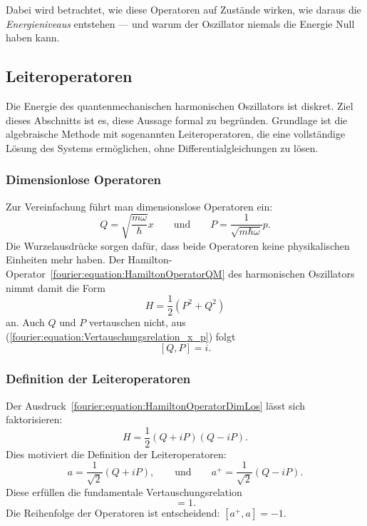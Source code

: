 Dabei wird betrachtet, wie diese Operatoren auf Zustände wirken, wie daraus die \emph{Energieniveaus} entstehen ---
und warum der Oszillator niemals die Energie Null haben kann.

\subsection{Leiteroperatoren\label{fourier:subsection:Leiteroperatoren}}
Die Energie des quantenmechanischen harmonischen Oszillators ist diskret.
Ziel dieses Abschnitts ist es, diese Aussage formal zu begründen.
Grundlage ist die algebraische Methode mit sogenannten Leiteroperatoren, die eine vollständige Lösung des Systems ermöglichen, ohne Differentialgleichungen zu lösen.	

\subsubsection{Dimensionlose Operatoren\label{fourier:subsubsection:DimensionsloseOperatoren}}
Zur Vereinfachung führt man dimensionslose Operatoren ein:
%
\[
	Q = \sqrt{\frac{m\omega}{\hbar}}x
	\qquad\text{und}\qquad
	P = \frac{1}{\sqrt{m\hbar\omega}}p.
\]
Die Wurzelausdrücke sorgen dafür, dass beide Operatoren keine physikalischen Einheiten mehr haben.
Der Hamilton-Operator~\ref{fourier:equation:HamiltonOperatorQM} des harmonischen Oszillators nimmt damit die Form
\begin{equation}\label{fourier:equation:HamiltonOperatorDimLos}
	H = \frac{1}{2}(P^2 + Q^2)
\end{equation}
an.
Auch $Q$ und $P$ vertauschen nicht, aus (\ref{fourier:equation:Vertauschungsrelation_x_p}) folgt
\[
	[Q,P] = i.
\]

\subsubsection{Definition der Leiteroperatoren\label{fourier:subsubsection:DefinitionLeiteroperatoren}}
Der Ausdruck~\ref{fourier:equation:HamiltonOperatorDimLos} lässt sich faktorisieren:
\[
	H = \frac{1}{2}(Q + iP)(Q - iP).
\]
Dies motiviert die Definition der Leiteroperatoren:
\begin{equation}
	a = \frac{1}{\sqrt{2}}(Q + iP),
	\qquad\text{und}\qquad
	a^+ = \frac{1}{\sqrt{2}}(Q - iP).
\end{equation}
Diese erfüllen die fundamentale Vertauschungsrelation
\begin{equation}
	[a, a^+] = 1.
\end{equation}
Die Reihenfolge der Operatoren ist entscheidend: $[a^+, a] = -1$.


